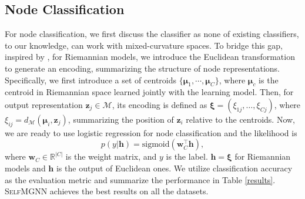 \subsection{Node Classification}
For node classification, we first discuss the classifier as none of existing classifiers, to our knowledge, can work with mixed-curvature spaces.
To bridge this gap, inspired by \cite{HGNN}, for Riemannian models, we introduce the Euclidean transformation to generate an encoding, summarizing the structure of node representations.
Specifically, we first introduce a set of centroids $\{\boldsymbol \mu_1,  \cdots, \boldsymbol \mu_C\}$,
where $\boldsymbol \mu_c$ is the centroid in Riemannian space learned jointly with the learning model. %
Then, for output representation $\boldsymbol z_j \in \mathcal M$, its encoding is defined as $\boldsymbol \xi=\left(\xi_{1j}, \ldots, \xi_{Cj}\right) $, where $\xi_{ij}=d_{\mathcal M}(\boldsymbol \mu_i, \boldsymbol z_j)$, summarizing the position of $\boldsymbol z_i $ relative to the centroids.
Now, we are ready to use logistic regression for node classification and the likelihood is 
\begin{equation}
p( y | \boldsymbol h )=\text{sigmoid}(\mathbf w_C^\top \boldsymbol h),
\end{equation}
where $\mathbf w_C \in \mathbb R^{|C|}$ is the weight matrix, and $y$ is the label.
$\boldsymbol h=\boldsymbol \xi$ for Riemannian models and $\boldsymbol h$ is the output of Euclidean ones.
We utilize classification accuracy \cite{kipf2016semi} as the evaluation metric and summarize the performance in Table \ref{results}.
\textsc{SelfMGNN} achieves the best results on all the datasets.

